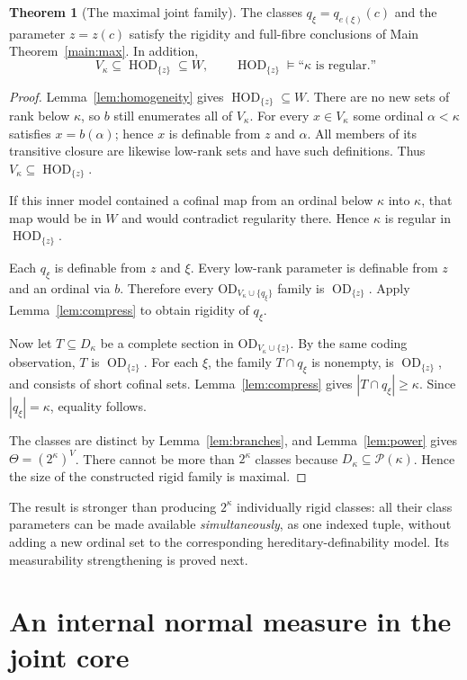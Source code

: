\documentclass[11pt,letterpaper]{article}
\theoremstyle{definition}
\newtheorem{theorem}[definition]{Theorem}
\numberwithin{equation}{section}
\newcommand{\OD}{\mathrm{OD}}
\newcommand{\Pow}{\mathcal P}
\newcommand{\HD}[1]{\operatorname{HOD}_{\{#1\}}}
\newcommand{\ODp}[1]{\operatorname{OD}_{\{#1\}}}
\begin{document}
\begin{theorem}[The maximal joint family]\label{thm:maxfamily}
The classes $q_\xi=q_{e(\xi)}(c)$ and the parameter $z=z(c)$ satisfy the rigidity and full-fibre conclusions of Main Theorem~\ref{main:max}. In addition,
\[
 V_\kappa\subseteq\HD{z}\subseteq W,
 \qquad \HD{z}\models\text{``$\kappa$ is regular.''}
\]
\end{theorem}
\begin{proof}
Lemma~\ref{lem:homogeneity} gives $\HD{z}\subseteq W$. There are no new sets of rank below $\kappa$, so $b$ still enumerates all of $V_\kappa$. For every $x\in V_\kappa$ some ordinal $\alpha<\kappa$ satisfies $x=b(\alpha)$; hence $x$ is definable from $z$ and $\alpha$. All members of its transitive closure are likewise low-rank sets and have such definitions. Thus $V_\kappa\subseteq\HD{z}$.

If this inner model contained a cofinal map from an ordinal below $\kappa$ into $\kappa$, that map would be in $W$ and would contradict regularity there. Hence $\kappa$ is regular in $\HD{z}$.

Each $q_\xi$ is definable from $z$ and $\xi$. Every low-rank parameter is definable from $z$ and an ordinal via $b$. Therefore every $\OD_{V_\kappa\cup\{q_\xi\}}$ family is $\ODp{z}$. Apply Lemma~\ref{lem:compress} to obtain rigidity of $q_\xi$.

Now let $T\subseteq D_\kappa$ be a complete section in $\OD_{V_\kappa\cup\{z\}}$. By the same coding observation, $T$ is $\ODp{z}$. For each $\xi$, the family $T\cap q_\xi$ is nonempty, is $\ODp{z}$, and consists of short cofinal sets. Lemma~\ref{lem:compress} gives $|T\cap q_\xi|\ge\kappa$. Since $|q_\xi|=\kappa$, equality follows.

The classes are distinct by Lemma~\ref{lem:branches}, and Lemma~\ref{lem:power} gives $\Theta=(2^\kappa)^V$. There cannot be more than $2^\kappa$ classes because $D_\kappa\subseteq\Pow(\kappa)$. Hence the size of the constructed rigid family is maximal.
\end{proof}

The result is stronger than producing $2^\kappa$ individually rigid classes: all their class parameters can be made available \emph{simultaneously}, as one indexed tuple, without adding a new ordinal set to the corresponding hereditary-definability model. Its measurability strengthening is proved next.

\section{An internal normal measure in the joint core}\label{sec:measure}
\end{document}

